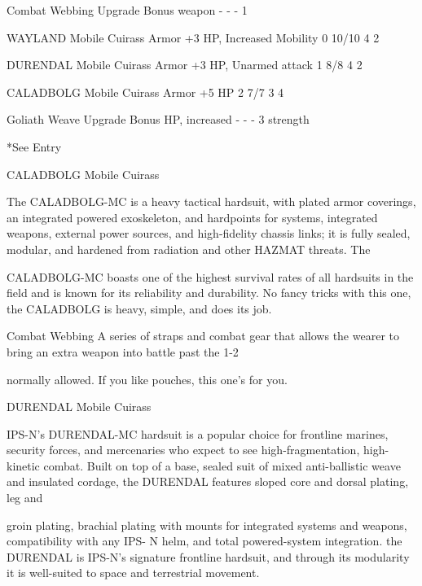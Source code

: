  Combat Webbing                        Upgrade       Bonus weapon                    -        -             -      1

  WAYLAND Mobile Cuirass               Armor         +3 HP, Increased Mobility      0         10/10         4      2

 DURENDAL Mobile Cuirass               Armor         +3 HP, Unarmed attack          1         8/8           4      2

 CALADBOLG Mobile Cuirass              Armor         +5 HP                          2         7/7           3      4

 Goliath Weave                         Upgrade       Bonus HP, increased            -         -             -      3
                                                    strength

*See Entry


CALADBOLG Mobile Cuirass

The CALADBOLG-MC is a heavy tactical hardsuit, with plated armor coverings, an integrated powered
exoskeleton, and hardpoints for systems, integrated weapons, external power sources, and high-fidelity
chassis links; it is fully sealed, modular, and hardened from radiation and other HAZMAT threats. The

CALADBOLG-MC boasts one of the highest survival rates of all hardsuits in the field and is known for its
reliability and durability. No fancy tricks with this one, the CALADBOLG is heavy, simple, and does its job.

Combat Webbing
A series of straps and combat gear that allows the wearer to bring an extra weapon into battle past the 1-2

normally allowed. If you like pouches, this one’s for you.


DURENDAL Mobile Cuirass

IPS-N’s DURENDAL-MC hardsuit is a popular choice for frontline marines, security forces, and mercenaries
who expect to see high-fragmentation, high-kinetic combat. Built on top of a base, sealed suit of mixed
anti-ballistic weave and insulated cordage, the DURENDAL features sloped core and dorsal plating, leg and




groin plating, brachial plating with mounts for integrated systems and weapons, compatibility with any IPS-
N helm, and total powered-system integration. the DURENDAL is IPS-N’s signature frontline hardsuit, and
through its modularity it is well-suited to space and terrestrial movement.

